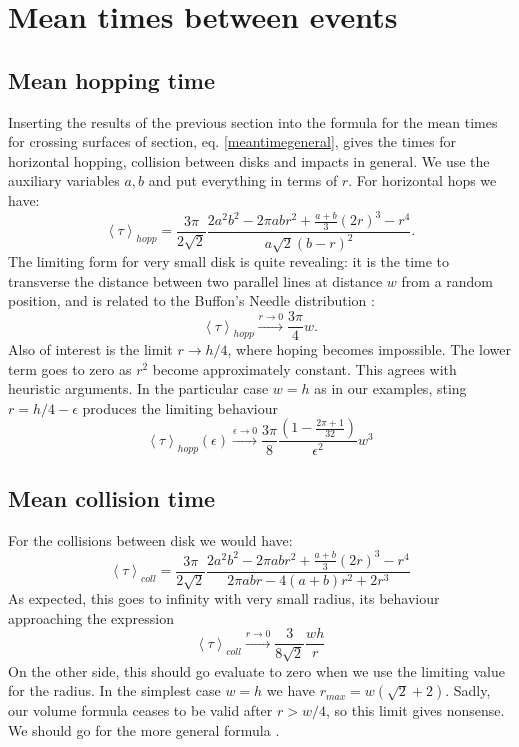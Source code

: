\documentclass[a4paper,10pt, jcp, aps, preprint]{revtex4-1}
\newcommand{\mean}[1]{\left \langle #1 \right \rangle}
\begin{document}
\section{Mean times between events}

\subsection{Mean hopping time}

Inserting the results of the previous section 
into the formula for the mean times for crossing
surfaces of section, eq. \ref{meantimegeneral}, gives the times for 
horizontal hopping, 
collision between disks and impacts in general. We use the auxiliary
variables $a,b$ and put everything in terms of $r$. For horizontal
hops we have:
\begin{equation}\label{hoptau}
 \mean{\tau}_{hopp} = 	
\frac{3 \pi}{2\sqrt{2}}
\frac{2 a^{2} b^{2}  - 2 \pi a b r^{2} + \textstyle \frac{a+b}{3}  (2r)^{3}  -  r^4}
{ a \sqrt{2}  ( b - r )^2}.
\end{equation}
The limiting form for very small disk is quite revealing: it is the time
to transverse the distance between two parallel lines at distance $w$ from
a random position, and is related to the Buffon's Needle distribution 
\cite{EScheinerman}:
\begin{equation}\label{hoptaulimit}
 \mean{\tau}_{hopp} \xrightarrow{r\rightarrow 0} 	
\frac{3 \pi}{4}w.
\end{equation}
Also of interest is the limit $r\rightarrow h/4$, where hoping becomes
impossible. The lower term goes to zero as $r^2$ become approximately constant.
This agrees with heuristic arguments. 
In the particular case $w=h$ as in our examples,
sting $r=h/4-\epsilon$ produces the limiting behaviour 
\begin{equation}
 \mean{\tau}_{hopp}(\epsilon) \xrightarrow{\epsilon\rightarrow 0} 	
\frac{3 \pi}{8}
\frac{(1-\frac{2\pi+1}{32})}
{ \epsilon^2} w^3
\end{equation} 

\subsection{Mean collision time}

For the collisions between disk we would have:
\begin{equation}\label{colltau}
 \mean{\tau}_{coll} = 	
\frac{3 \pi}{2\sqrt{2}}
\frac {2 a^{2} b^{2}  - 2 \pi a b r^{2} + \textstyle \frac{a+b}{3}  (2r)^{3}  -  r^4}
{2\pi a b r -4(a+b)r^2+2r^3}
\end{equation}
As expected, this goes to infinity with very small radius, its behaviour
approaching the expression
\begin{equation}\label{colltaulim0}
\mean{\tau}_{coll}  \xrightarrow{r\rightarrow 0} 
\frac{3}{8\sqrt{2}}\frac{wh}{r}
\end{equation}
On the other side, this should go evaluate to zero when
we use the limiting value for the radius. In the simplest
case  $w = h$ we have $r_{max}= w(\sqrt{2}+2)$. Sadly, our volume
formula ceases to be valid after $r>w/4$, so this limit gives nonsense.
We should go for the more general formula \cite{notascalculokarel}.
\end{document}
